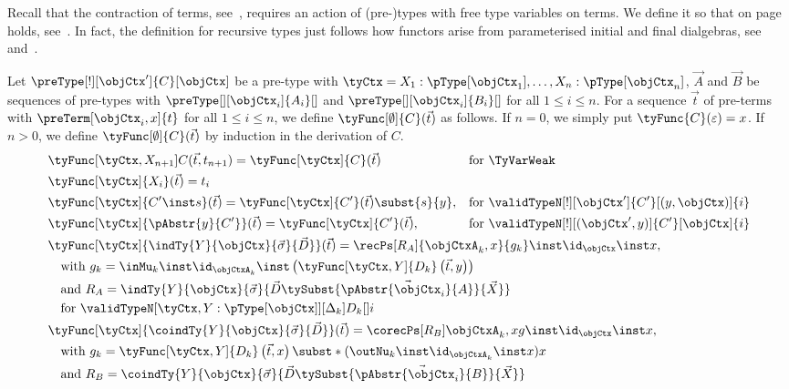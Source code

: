 \documentclass[preprint]{sigplanconf}
\begin{document}
Recall that the contraction of terms, see~, requires
an action of (pre-)types with free type variables on terms.
We define it so that
 on page~\pageref{eq:typing-functor-from-type}
holds, see~.
In fact, the definition for recursive types just follows how functors
arise from parameterised initial and final dialgebras,
see~ and~\cite{Basold-DepCoindFibDialg}.
\begin{definition}
  \label{def:type-action}
  Let $\preType[!][\objCtx']{C}[\objCtx]$ be a pre-type with
  $\tyCtx = X_1 : \pType[\objCtx_1] , \dotsc, X_n : \pType[\objCtx_n]$,
  $\vec{A}$ and $\vec{B}$ be sequences of pre-types with
  $\preType[][\objCtx_i]{A_i}[]$ and $\preType[][\objCtx_i]{B_i}[]$ for all
  $1 \leq i \leq n$.
  For a sequence $\vec{t}$ of pre-terms with
  $\preTerm[\objCtx_i, x]{t}$ for all $1 \leq i \leq n$, we define
  $\tyFunc[\emptyset]{C}(\vec{t})$ as follows.
If $n = 0$, we simply put $\tyFunc{C}(\varepsilon) = x$.
  If $n > 0$, we define $\tyFunc[\emptyset]{C}(\vec{t})$ by
  induction in the derivation of $C$.
  \begin{align*}
    & \begin{aligned}
      & \tyFunc[\tyCtx, X_{n+1}]{C}(\vec{t}, t_{n+1})
      = \tyFunc[\tyCtx]{C}(\vec{t})
      & & \text{for } \TyVarWeak \\
      & \tyFunc[\tyCtx]{X_i}(\vec{t}) = t_i \\
      & \tyFunc[\tyCtx]{C' \inst s}(\vec{t})
      = \tyFunc[\tyCtx]{C'}(\vec{t}) \subst{s}{y},
      & & \text{for }
      \validTypeN[!][\objCtx']{C'}[(y, \objCtx)]{i} \\
      & \tyFunc[\tyCtx]{\pAbstr{y}{C'}}(\vec{t}) = \tyFunc[\tyCtx]{C'}(\vec{t}),
      & & \text{for }
      \validTypeN[!][(\objCtx',y)]{C'}[\objCtx]{i} \\
    \end{aligned} \\
    & \tyFunc[\tyCtx]{\indTy{Y}{\objCtx}{\vec{\sigma}}{\vec{D}}}(\vec{t})
      = \recPs[R_A]{\objCtxA_k, x}{g_k} \inst \id_{\objCtx} \inst x, \\
      & \quad \text{with } g_k =
      \inMu_k
\inst \id_{\objCtxA_k} \inst
      \left(\tyFunc[\tyCtx, Y]{D_k}\left(
          \vec{t}, y
\right)\right) \\
      & \quad \text{and } R_{A} =
      \indTy{Y}{\objCtx}{\vec{\sigma}}{\vec{D} \tySubst{\vec{\pAbstr{\objCtx_i}{A}}}{\vec{X}}} \\
      & \quad \text{for }
      \validTypeN[\tyCtx, Y : {\pType[\objCtx]}][\Delta_k]{D_k}[]{i} \\
    & \tyFunc[\tyCtx]{\coindTy{Y}{\objCtx}{\vec{\sigma}}{\vec{D}}}(\vec{t})
      = \corecPs[R_{B}]{\objCtxA_k, x}{g}
      \inst \id_{\objCtx} \inst x, \\
      & \quad \text{with } g_k =
      \tyFunc[\tyCtx,Y]{D_k}\left( \vec{t}, x \right)
      \subst*{(\outNu_k \inst \id_{\objCtxA_k} \inst x)}{x} \\
      & \quad \text{and } R_{B} =
      \coindTy{Y}{\objCtx}{\vec{\sigma}}{\vec{D} \tySubst{\vec{\pAbstr{\objCtx_i}{B}}}{\vec{X}}}
  \end{align*}


\end{definition}
\end{document}
